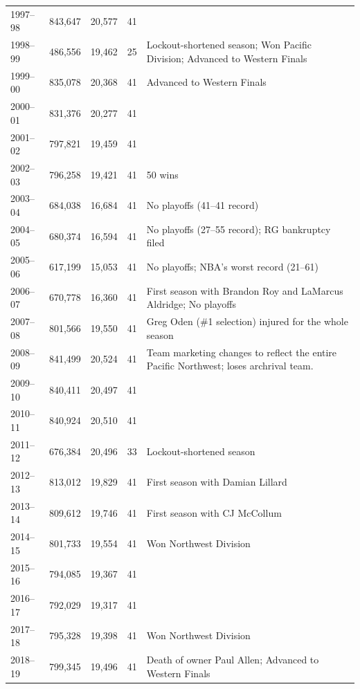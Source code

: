 \documentclass{article}
\begin{document}
\begin{tabular}{lllll}
1997–98 & 843,647 & 20,577 & 41 &  \\
1998–99 & 486,556 & 19,462 & 25 & Lockout-shortened season; Won Pacific Division; Advanced to Western Finals \\
1999–00 & 835,078 & 20,368 & 41 & Advanced to Western Finals \\
2000–01 & 831,376 & 20,277 & 41 &  \\
2001–02 & 797,821 & 19,459 & 41 &  \\
2002–03 & 796,258 & 19,421 & 41 & 50 wins \\
2003–04 & 684,038 & 16,684 & 41 & No playoffs (41–41 record) \\
2004–05 & 680,374 & 16,594 & 41 & No playoffs (27–55 record); RG bankruptcy filed \\
2005–06 & 617,199 & 15,053 & 41 & No playoffs; NBA's worst record (21–61) \\
2006–07 & 670,778 & 16,360 & 41 & First season with Brandon Roy and LaMarcus Aldridge; No playoffs \\
2007–08 & 801,566 & 19,550 & 41 & Greg Oden (\#1 selection) injured for the whole season \\
2008–09 & 841,499 & 20,524 & 41 & Team marketing changes to reflect the entire Pacific Northwest; loses archrival team. \\
2009–10 & 840,411 & 20,497 & 41 &  \\
2010–11 & 840,924 & 20,510 & 41 &  \\
2011–12 & 676,384 & 20,496 & 33 & Lockout-shortened season \\
2012–13 & 813,012 & 19,829 & 41 & First season with Damian Lillard \\
2013–14 & 809,612 & 19,746 & 41 & First season with CJ McCollum \\
2014–15 & 801,733 & 19,554 & 41 & Won Northwest Division \\
2015–16 & 794,085 & 19,367 & 41 &  \\
2016–17 & 792,029 & 19,317 & 41 &  \\
2017–18 & 795,328 & 19,398 & 41 & Won Northwest Division \\
2018–19 & 799,345 & 19,496 & 41 & Death of owner Paul Allen; Advanced to Western Finals \\
\bottomrule
\end{tabular}
\end{document}
